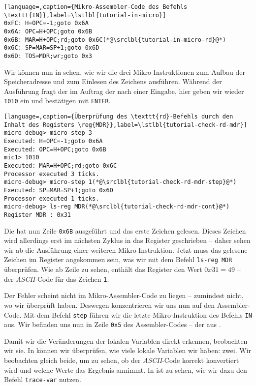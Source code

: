 \begin{lstlisting}[language=,caption={Mikro-Assembler-Code des Befehls \texttt{IN}},label=\lstlbl{tutorial-in-micro}]
0xFC: H=OPC=-1;goto 0x6A
0x6A: OPC=H+OPC;goto 0x6B
0x6B: MAR=H+OPC;rd;goto 0x6C(*@\srclbl{tutorial-in-micro-rd}@*)
0x6C: SP=MAR=SP+1;goto 0x6D
0x6D: TOS=MDR;wr;goto 0x3
\end{lstlisting}

Wir können nun in  sehen, wie wir die drei Mikro-Instruktionen zum Aufbau der Speicheradresse und zum Einlesen des Zeichens ausführen. Während der Ausführung fragt der \md im Auftrag der \mic nach einer Eingabe, hier geben wir wieder \texttt{1010} ein und bestätigen mit \texttt{ENTER}.

\begin{lstlisting}[language=,caption={Überprüfung des \texttt{rd}-Befehls durch den Inhalt des Registers \reg{MDR}},label=\lstlbl{tutorial-check-rd-mdr}]
micro-debug> micro-step 3
Executed: H=OPC=-1;goto 0x6A
Executed: OPC=H+OPC;goto 0x6B
mic1> 1010
Executed: MAR=H+OPC;rd;goto 0x6C
Processor executed 3 ticks.
micro-debug> micro-step 1(*@\srclbl{tutorial-check-rd-mdr-step}@*)
Executed: SP=MAR=SP+1;goto 0x6D
Processor executed 1 ticks.
micro-debug> ls-reg MDR(*@\srclbl{tutorial-check-rd-mdr-cont}@*)
Register MDR : 0x31
\end{lstlisting}

Die \mic hat nun Zeile \texttt{0x6B} ausgeführt und das erste Zeichen gelesen. Dieses Zeichen wird allerdings erst im nächsten Zyklus in das Register  geschrieben -- daher sehen wir ab  die Ausführung einer weiteren Mikro-Instruktion. Jetzt muss das gelesene Zeichen im Register  angekommen sein, was wir mit dem Befehl \texttt{ls-reg MDR} überprüfen. Wie ab Zeile  zu sehen, enthält das Register  den Wert $0x31=49$ -- der \emph{ASCII}-Code für das Zeichen \texttt{1}.

Der Fehler scheint nicht im Mikro-Assembler-Code zu liegen -- zumindest nicht, wo wir überprüft haben. Deswegen konzentrieren wir uns nun auf den Assembler-Code. Mit dem Befehl \texttt{step} führen wir die letzte Mikro-Instruktion des Befehls \texttt{IN} aus. Wir befinden uns nun in Zeile \texttt{0x5} des Assembler-Codes -- der  aus .

Damit wir die Veränderungen der lokalen Variablen direkt erkennen, beobachten wir sie. In  können wir überprüfen, wie viele lokale Variablen wir haben: zwei. Wir beobachten gleich beide, um zu sehen, ob der \emph{ASCII}-Code korrekt konvertiert wird und welche Werte das Ergebnis annimmt. In  ist zu sehen, wie wir dazu den Befehl \texttt{trace-var} nutzen.

